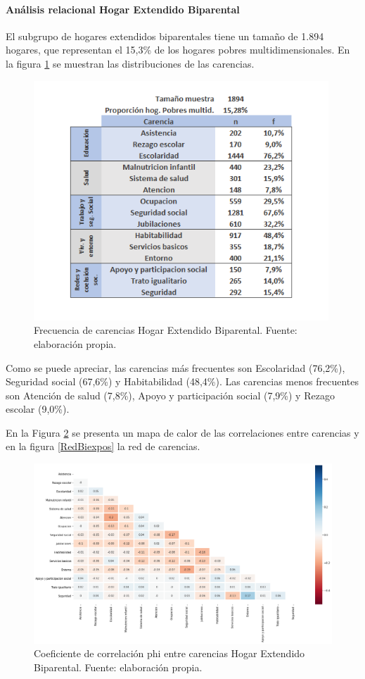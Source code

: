 \documentclass[12pt,letterpaper,spanish]{article}
\begin{document}
\paragraph{Análisis relacional Hogar Extendido Biparental}

El subgrupo de hogares extendidos biparentales tiene un tamaño de 1.894 hogares, que representan el 15,3\% de los hogares pobres multidimensionales. En la figura \ref{freBiex} se muestran las distribuciones de las carencias.

\begin{figure}[H]
  \centering
    \includegraphics[height=9cm]{HOGARES/tabla_biex.png}
    \caption{Frecuencia de carencias Hogar Extendido Biparental. Fuente: elaboración propia.}
    \label{freBiex}
\end{figure}

Como se puede apreciar, las carencias más frecuentes son Escolaridad (76,2\%), Seguridad social (67,6\%) y Habitabilidad (48,4\%). Las carencias menos frecuentes son Atención de salud (7,8\%), Apoyo y participación social (7,9\%) y Rezago escolar (9,0\%).

En la Figura \ref{HMBiex} se presenta un mapa de calor de las correlaciones entre carencias y en la figura \ref{RedBiexpos} la red de carencias.

\begin{figure}[H]
    \centering
    \includegraphics[width=\textwidth]{Heatmaps/Heatmap_pearson_car_biex.png}
    \caption{Coeficiente de correlación phi entre carencias Hogar Extendido Biparental. Fuente: elaboración propia.}
    \label{HMBiex}
\end{figure}
\end{document}
